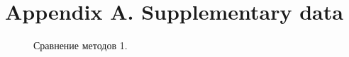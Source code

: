 \documentclass[a4paper,fleqn]{cas-dc}
\begin{document}
\section*{Appendix A. Supplementary data}
\begin{figure}[ht]
    \caption{Сравнение методов 1.}
    \label{app_1_sravnenie}
    \end{figure}
\end{document}
